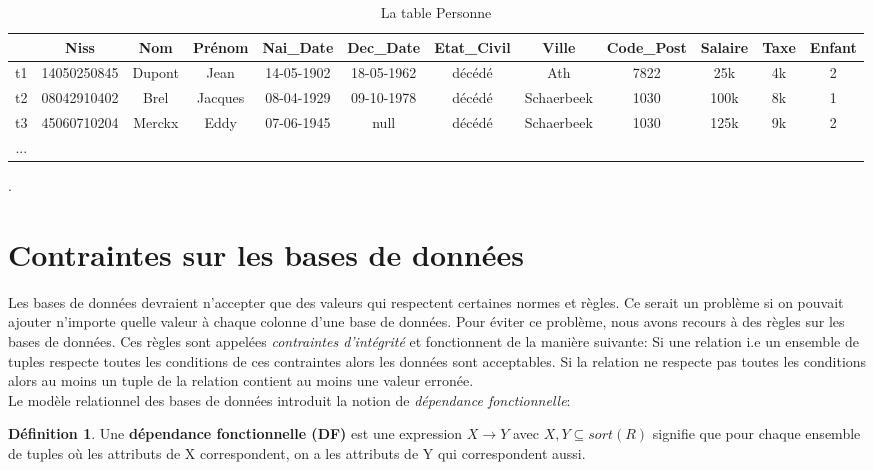\documentclass[letterpaper, 12pt]{report}
\theoremstyle{definition}
\newtheorem{mydef}{Définition}
\newcommand{\alinea}{
\hspace*{0.5cm}}
\begin{document}
\begin{table}[H]
 \footnotesize	
	\centering
	\hspace*{-2cm}\begin{tabular}{|c|c c c c c c c c c c c|}
	\hline
	    & Niss & Nom & Prénom & Nai\_Date & Dec\_Date & Etat\_Civil & Ville & Code\_Post & Salaire & Taxe & Enfant\\
	\hline
	 t1 & 14050250845 & Dupont & Jean & 14-05-1902 & 18-05-1962 & décédé & Ath & 7822 & 25k & 4k & 2\\
	 t2 & 08042910402 & Brel & Jacques & 08-04-1929 & 09-10-1978 & décédé & Schaerbeek & 1030 & 100k & 8k & 1\\
	 t3 & 45060710204 & Merckx & Eddy & 07-06-1945 & null & décédé & Schaerbeek & 1030 & 125k & 9k & 2\\
	 ... &  & &  &  & & & & & & & \\
	\hline
	 
	 \hline
	\end{tabular}
	\caption{\label{tablePerson} La table Personne}.
\end{table}


\newpage

\section{Contraintes sur les bases de données}

\alinea Les bases de données devraient n'accepter que des valeurs qui respectent certaines normes et règles. Ce serait un problème si on pouvait ajouter n'importe quelle valeur à chaque colonne d'une base de données. Pour éviter ce problème, nous avons recours à des règles sur les bases de données. Ces règles sont appelées \emph{contraintes d'intégrité} et fonctionnent de la manière suivante: Si une relation i.e un ensemble de tuples respecte toutes les conditions de ces contraintes alors les données sont acceptables. Si la relation ne respecte pas toutes les conditions alors au moins un tuple de la relation contient au moins  une valeur erronée. \\

Le modèle relationnel des bases de données introduit la notion de \emph{dépendance fonctionnelle}:

\begin{mydef}
Une \textbf{dépendance fonctionnelle (DF)} est une expression $X \rightarrow Y$ avec $X,Y \subseteq
sort(R)$ signifie que pour chaque ensemble de tuples où les attributs de X correspondent, on a les attributs de Y qui correspondent aussi.
\end{mydef} 
\end{document}
